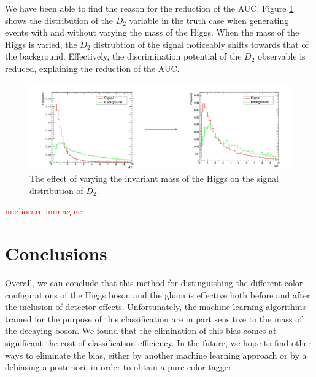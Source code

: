 \documentclass[10pt,a4paper]{book}
\newcommand\todo[1]{\textcolor{red}{#1}}
\begin{document}
We have been able to find the reason for the reduction of the AUC. Figure \ref{d2 inv mass} shows the distribution of the $D_2$ variable in the truth case when generating events with and without varying the mass of the Higgs. When the mass of the Higgs is varied, the $D_2$ distrubtion of the signal noticeably shifts towards that of the background. Effectively, the discrimination potential of the $D_2$ observable is reduced, explaining the reduction of the AUC.

\begin{figure}
\centering
\includegraphics[scale=0.3]{ch4_images/d2_inv_mass}
\caption{The effect of varying the invariant mass of the Higgs on the signal distribution of $D_2$.}
\label{d2 inv mass}
\end{figure}

\todo{migliorare immagine}

\section{Conclusions}

Overall, we can conclude that this method for distinguishing the different color configurations of the Higgs boson and the gluon is effective both before and after the inclusion of detector effects. Unfortunately, the machine learning algorithms trained for the purpose of this classification are in part sensitive to the mass of the decaying boson. We found that the elimination of this bias comes at significant the cost of classification efficiency. In the future, we hope to find other ways to eliminate the bias, either by another machine learning approach or by a debiasing a posteriori, in order to obtain a pure color tagger.

\end{document}
